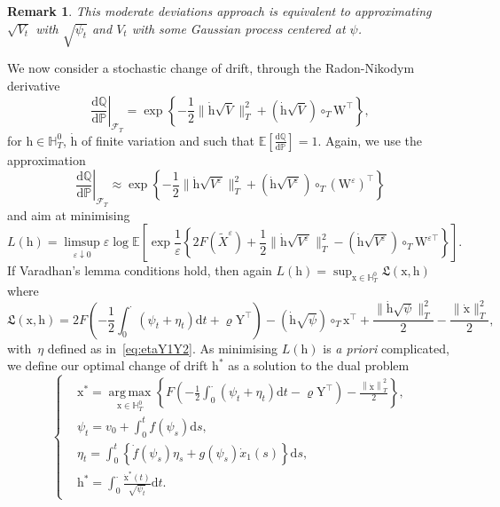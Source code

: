 \documentclass{amsart}[11pt]
\numberwithin{equation}{section}
\numberwithin{theorem}{subsection}
\numberwithin{proposition}{subsection}
\numberwithin{definition}{subsection}
\numberwithin{lemma}{subsection}
\newtheorem*{remark}{Remark}
\numberwithin{assumption}{subsection}
\newcommand{\Ff}{\mathcal{F}}
\newcommand{\HH}{\mathbb{H}}
\newcommand{\PP}{\mathbb{P}}
\newcommand{\QQ}{\mathbb{Q}}
\newcommand{\Lf}{\mathfrak{L}}
\newcommand{\EE}{\mathbb{E}}
\newcommand{\cT}{\circ_{T}}
\newcommand{\Wf}{\boldsymbol{\mathrm{W}}}
\newcommand{\Yf}{\boldsymbol{\mathrm{Y}}}
\newcommand{\vrho}{\boldsymbol{\mathrm{\varrho}}}
\newcommand{\D}{\mathrm{d}}
\newcommand{\eps}{\varepsilon}
\newcommand{\hh}{\boldsymbol{\mathrm{h}}}
\newcommand{\xx}{\boldsymbol{\mathrm{x}}}
\DeclareMathOperator*{\argmax}{arg\,max}
\begin{document}
\begin{remark}
This moderate deviations approach is equivalent to approximating $\sqrt{V_t}$ with $\sqrt{\psi_t}$ and $V_t$ with some Gaussian process centered at $\psi$.
\end{remark}

We now consider a stochastic change of drift, 
through the Radon-Nikodym derivative
\[
\left.\frac{\D\QQ}{\D\PP}\right\vert_{\Ff_T} = \exp\left\{-\frac{1}{2}\|\dot{\hh}\sqrt{V}\|_{T}^2 + (\dot{\hh}\sqrt{V})\cT\Wf^\top\right\},
\]
for $\hh \in \HH_T^0$, $\dot{\hh}$ of finite variation and such that $\EE\left[\frac{\D\QQ}{\D\PP}\right]=1$. 
Again, we use the approximation
\[
\left.\frac{\D\QQ}{\D\PP}\right\vert_{\Ff_T} \approx \exp\left\{-\frac{1}{2}\|\dot{\hh}\sqrt{V^\eps}\|_{T}^2 + (\dot{\hh}\sqrt{V^\eps})\cT({\Wf^\eps})^\top\right\}
\]
and aim at minimising
\[
L(\hh) = \limsup\limits_{\eps \downarrow 0} \eps\log\EE\left[\exp\frac{1}{\eps}\left\{
2F(\widetilde{X}^\eps) +\frac{1}{2}\|\dot{\hh}\sqrt{V^\eps}\|^2_T - \left (\dot{\hh}\sqrt{V^\eps}\right )\cT \Wf^{\eps\top}\right\}\right].
\]
If Varadhan's lemma conditions hold, then again
$L(\hh) = \sup_{\xx \in \HH_T^0}\Lf(\xx,\hh)$
where
$$
\Lf(\xx,\hh) = 2F\left(-\frac{1}{2}\int_{0}^{\cdot}(\psi_t + \eta_t)\D t + \vrho \Yf^\top\right) - \left (\dot{\hh}\sqrt{\psi}\right )\cT \xx^\top + \frac{\|\dot{\hh}\sqrt{\psi}\|_{T}^2}{2}
- \frac{\|\dot{\xx}\|_{T}^2}{2},
$$
with~$\eta$ defined as in~\eqref{eq:etaY1Y2}. As minimising $L(\hh)$ is \textit{a priori} complicated, we define our optimal change of drift $\hh^{*}$ as a solution to the dual problem
\[
\begin{cases}
&\displaystyle \xx^{*} = \argmax\limits_{\xx \in \HH_T^0} \left\{
F\left(-\frac{1}{2}\int_{0}^{\cdot} \left(\psi_t + \eta_t\right)\D t - \vrho \Yf^\top \right)
- \frac{\left\|\dot{\xx}\right\|_{T}^2}{2}
\right\},\\
&\displaystyle \psi_t = v_0 + \int_0^t f(\psi_s)\D s, \\
&\displaystyle \eta_t = \int_0^t\left\{\dot{f}(\psi_s)\eta_s + g(\psi_s)\dot{x}_1(s)\right\}\D s, \\
&\displaystyle  \hh^{*} = \int_{0}^{\cdot}\frac{\dot{\xx}^{*}(t)}{\sqrt{\psi_t}}\D t.
\end{cases}
\]

\end{document}
